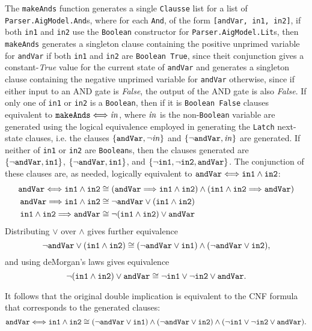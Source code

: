 \documentclass[12pt,a4paper,twoside,openright]{report}
\begin{document}
The \verb,makeAnds, function generates a single \verb,Clausse, list for a list of \verb,Parser.AigModel.And,s,
where for each \verb,And,, of the form \verb.[andVar, in1, in2]., if both \verb,in1, and \verb,in2, use
the \verb,Boolean, constructor for \verb,Parser.AigModel.Lit,s, then \verb,makeAnds, generates a singleton
clause containing the positive unprimed variable for \verb,andVar, if both \verb,in1, and \verb,in2, are
\verb,Boolean True,, since theit conjunction gives a constant-{\it True} value for the current state of
\verb,andVar, and generates a singleton clause containing the negative unprimed variable for \verb,andVar,
otherwise, since if either input to an AND gate is {\it False}, the output of the AND gate is also {\it False}.
If only one of \verb,in1, or \verb,in2, is a \verb,Boolean,, then if it is \verb,Boolean False, clauses equivalent
to ${\tt makeAnds} \Longleftrightarrow {\it in}$, where ${\it in}$ is the non-\verb,Boolean, variable
are generated using the logical equivalence employed in generating the \verb,Latch, next-state clauses, i.e.
the clauses $\{\verb,andVar,, \neg {\it in}\}$ and $\{\neg\verb,andVar,, {\it in}\}$ are generated.
If neither of \verb,in1, or \verb,in2, are \verb,Boolean,s, then the clauses generated are
$\{\neg\verb,andVar,, \verb,in1,\}$, $\{\neg\verb,andVar,, \verb,in1,\}$, and
$\{\neg\verb,in1,,\neg\verb,in2,,\verb,andVar,\}$. The conjunction of these clauses are, as needed,
logically equivalent to $\verb,andVar, \Longleftrightarrow \verb,in1, \wedge \verb,in2,$:
\begin{align*}
{\tt andVar} \Longleftrightarrow {\tt in1} \wedge {\tt in2} &\cong
({\tt andVar} \Longrightarrow {\tt in1} \wedge {\tt in2}) \wedge
({\tt in1} \wedge {\tt in2} \Longrightarrow {\tt andVar})\\
{\tt andVar} \Longrightarrow {\tt in1} \wedge {\tt in2} &\cong
\neg {\tt andVar} \vee ({\tt in1} \wedge {\tt in2})\\
{\tt in1} \wedge {\tt in2} \Longrightarrow {\tt andVar} &\cong
\neg ({\tt in1} \wedge {\tt in2}) \vee {\tt andVar}
\end{align*}
Distributing $\vee$ over $\wedge$ gives further equivalence
$$\neg {\tt andVar} \vee ({\tt in1} \wedge {\tt in2}) \cong
(\neg {\tt andVar} \vee {\tt in1}) \wedge (\neg {\tt andVar} \vee {\tt in2}),$$
and using deMorgan's laws gives equivalence
$$\neg ({\tt in1} \wedge {\tt in2}) \vee {\tt andVar} \cong
\neg {\tt in1} \vee \neg {\tt in2} \vee {\tt andVar}.$$

It follows that the original double implication is equivalent to the CNF
formula that corresponds to the generated clauses:
$$ {\tt andVar} \Longleftrightarrow {\tt in1} \wedge {\tt in2} \cong
(\neg {\tt andVar} \vee {\tt in1}) \wedge (\neg {\tt andVar} \vee {\tt in2}) \wedge
(\neg {\tt in1} \vee \neg {\tt in2} \vee {\tt andVar}).$$
\end{document}

